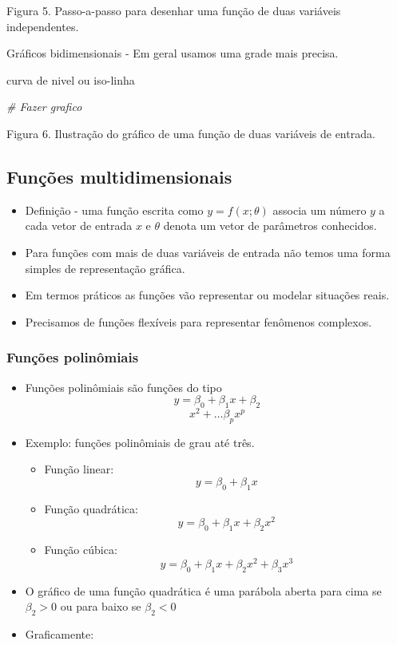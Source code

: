 \documentclass[
]{article}
\newenvironment{Shaded}{\begin{snugshade}}{\end{snugshade}}
\newcommand{\CommentTok}[1]{\textcolor[rgb]{0.56,0.35,0.01}{\textit{#1}}}
\providecommand{\tightlist}{%
  \setlength{\itemsep}{0pt}\setlength{\parskip}{0pt}}
\begin{document}
Figura 5. Passo-a-passo para desenhar uma função de duas variáveis
independentes.

Gráficos bidimensionais - Em geral usamos uma grade mais precisa.

curva de nivel ou iso-linha

\begin{Shaded}
\begin{Highlighting}[]
\CommentTok{\# Fazer grafico}
\end{Highlighting}
\end{Shaded}

Figura 6. Ilustração do gráfico de uma função de duas variáveis de
entrada.

\hypertarget{funuxe7uxf5es-multidimensionais}{%
\subsection{Funções
multidimensionais}\label{funuxe7uxf5es-multidimensionais}}

\begin{itemize}
\tightlist
\item
  Definição - uma função escrita como \(y = f(x; \theta)\) associa um
  número \(y\) a cada vetor de entrada \(x\) e \(\theta\) denota um
  vetor de parâmetros conhecidos.
\item
  Para funções com mais de duas variáveis de entrada não temos uma forma
  simples de representação gráfica.
\item
  Em termos práticos as funções vão representar ou modelar situações
  reais.
\item
  Precisamos de funções flexíveis para representar fenômenos complexos.
\end{itemize}

\hypertarget{funuxe7uxf5es-polinuxf4miais}{%
\subsubsection{Funções polinômiais}\label{funuxe7uxf5es-polinuxf4miais}}

\begin{itemize}
\item
  Funções polinômiais são funções do tipo
  \[ y = \beta_{0} + \beta_{1}x + \beta_{2}\] \[x^2 + … \beta_{p} x^p\]
\item
  Exemplo: funções polinômiais de grau até três.

  \begin{itemize}
  \tightlist
  \item
    Função linear: \[y = \beta_0 + \beta_1x\]
  \item
    Função quadrática: \[y = \beta_0 + \beta_1x + \beta_2x^2\]
  \item
    Função cúbica: \[y = \beta_0 + \beta_1x + \beta_2x^2 + \beta_3x^3\]
  \end{itemize}
\item
  O gráfico de uma função quadrática é uma parábola aberta para cima se
  \(\beta_2 > 0\) ou para baixo se \(\beta_2 < 0\)
\item
  Graficamente:
\end{itemize}
\end{document}
